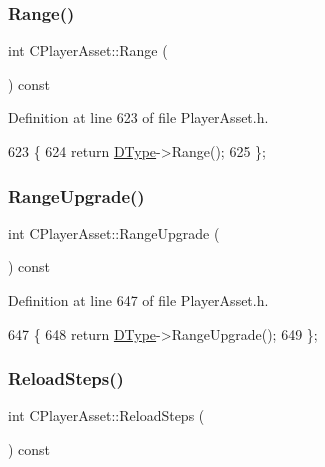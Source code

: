 \subsubsection{\texorpdfstring{Range()}{Range()}}
{\footnotesize\ttfamily int C\+Player\+Asset\+::\+Range (\begin{DoxyParamCaption}{ }\end{DoxyParamCaption}) const\hspace{0.3cm}{\ttfamily [inline]}}



Definition at line 623 of file Player\+Asset.\+h.


\begin{DoxyCode}
623                          \{
624             \textcolor{keywordflow}{return} \hyperlink{classCPlayerAsset_a5d61f73471e1e6f0a6ab15f2ffa7b359}{DType}->Range(); 
625         \};
\end{DoxyCode}
\hypertarget{classCPlayerAsset_aad35da7eb13a1d5830471a0f6de5090e}{}\label{classCPlayerAsset_aad35da7eb13a1d5830471a0f6de5090e} 
\subsubsection{\texorpdfstring{Range\+Upgrade()}{RangeUpgrade()}}
{\footnotesize\ttfamily int C\+Player\+Asset\+::\+Range\+Upgrade (\begin{DoxyParamCaption}{ }\end{DoxyParamCaption}) const\hspace{0.3cm}{\ttfamily [inline]}}



Definition at line 647 of file Player\+Asset.\+h.


\begin{DoxyCode}
647                                 \{
648             \textcolor{keywordflow}{return} \hyperlink{classCPlayerAsset_a5d61f73471e1e6f0a6ab15f2ffa7b359}{DType}->RangeUpgrade();
649         \};
\end{DoxyCode}
\hypertarget{classCPlayerAsset_a0c696a50d23ee7fb3fcfbf7e696c739f}{}\label{classCPlayerAsset_a0c696a50d23ee7fb3fcfbf7e696c739f} 
\subsubsection{\texorpdfstring{Reload\+Steps()}{ReloadSteps()}}
{\footnotesize\ttfamily int C\+Player\+Asset\+::\+Reload\+Steps (\begin{DoxyParamCaption}{ }\end{DoxyParamCaption}) const\hspace{0.3cm}{\ttfamily [inline]}}



